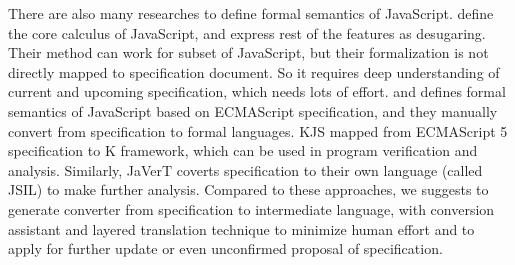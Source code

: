 



There are also many researches to define formal semantics of JavaScript. \cite{lambdajs} define the core calculus of JavaScript, and express rest of the features as desugaring. Their method can
work for subset of JavaScript, but their formalization is not directly mapped to specification document. So it requires deep understanding of current and upcoming specification,
which needs lots of effort. \cite{kjs} and \cite{javert} defines formal semantics of JavaScript based on ECMAScript specification, and they manually convert from specification
to formal languages. KJS mapped from ECMAScript 5 specification to K framework, which can be used in program verification and analysis. Similarly, JaVerT coverts specification
to their own language (called JSIL) to make further analysis. Compared to these approaches, we suggests to generate converter from specification to intermediate language, with
conversion assistant and layered translation technique to minimize human effort and to apply for further update or even unconfirmed proposal of specification.


